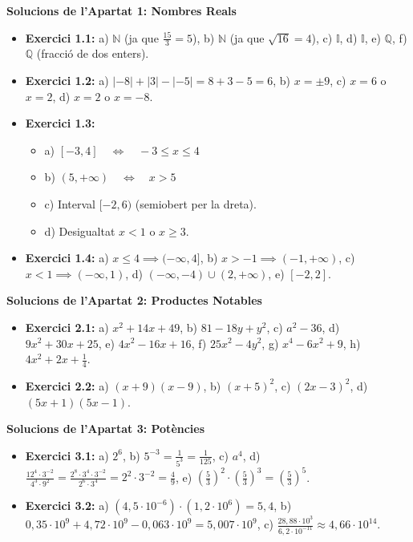 \documentclass[12pt]{article}
\begin{document}
\begin{solucio}
\textbf{Solucions de l'Apartat 1: Nombres Reals}
\begin{itemize}
    \item \textbf{Exercici 1.1:} a) $\mathbb{N}$ (ja que $\frac{15}{3}=5$), b) $\mathbb{N}$ (ja que $\sqrt{16}=4$), c) $\mathbb{I}$, d) $\mathbb{I}$, e) $\mathbb{Q}$, f) $\mathbb{Q}$ (fracció de dos enters).
    \item \textbf{Exercici 1.2:} a) $|-8|+|3|-|-5| = 8 + 3 - 5 = 6$, b) $x = \pm 9$, c) $x = 6$ o $x = 2$, d) $x = 2$ o $x = -8$.
    \item \textbf{Exercici 1.3:}
    \begin{itemize}
        \item a) $[-3, 4] \quad \iff \quad -3 \le x \le 4$
        \item b) $(5, +\infty) \quad \iff \quad x > 5$
        \item c) Interval $[-2, 6)$ (semiobert per la dreta).
        \item d) Desigualtat $x < 1$ o $x \ge 3$.
    \end{itemize}
    \item \textbf{Exercici 1.4:} a) $x \le 4 \implies (-\infty, 4]$, b) $x > -1 \implies (-1, +\infty)$, c) $x < 1 \implies (-\infty, 1)$, d) $(-\infty, -4) \cup (2, +\infty)$, e) $[-2, 2]$.
\end{itemize}
\end{solucio}

\begin{solucio}
\textbf{Solucions de l'Apartat 2: Productes Notables}
\begin{itemize}
    \item \textbf{Exercici 2.1:} a) $x^2+14x+49$, b) $81-18y+y^2$, c) $a^2-36$, d) $9x^2+30x+25$, e) $4x^2-16x+16$, f) $25x^2-4y^2$, g) $x^4-6x^2+9$, h) $4x^2+2x+\frac{1}{4}$.
    \item \textbf{Exercici 2.2:} a) $(x+9)(x-9)$, b) $(x+5)^2$, c) $(2x-3)^2$, d) $(5x+1)(5x-1)$.
\end{itemize}
\end{solucio}

\begin{solucio}
\textbf{Solucions de l'Apartat 3: Potències}
\begin{itemize}
    \item \textbf{Exercici 3.1:} a) $2^6$, b) $5^{-3} = \frac{1}{5^3} = \frac{1}{125}$, c) $a^4$, d) $\frac{12^4 \cdot 3^{-2}}{4^3 \cdot 9^2} = \frac{2^8 \cdot 3^4 \cdot 3^{-2}}{2^6 \cdot 3^4} = 2^2 \cdot 3^{-2} = \frac{4}{9}$, e) $\left(\frac{5}{3}\right)^2 \cdot \left(\frac{5}{3}\right)^3 = \left(\frac{5}{3}\right)^5$.
    \item \textbf{Exercici 3.2:} a) $(4{,}5 \cdot 10^{-6}) \cdot (1{,}2 \cdot 10^6) = 5{,}4$, b) $0{,}35 \cdot 10^9 + 4{,}72 \cdot 10^9 - 0{,}063 \cdot 10^9 = 5{,}007 \cdot 10^9$, c) $\frac{28{,}88 \cdot 10^3}{6{,}2 \cdot 10^{-11}} \approx 4{,}66 \cdot 10^{14}$.
\end{itemize}
\end{solucio}
\end{document}
